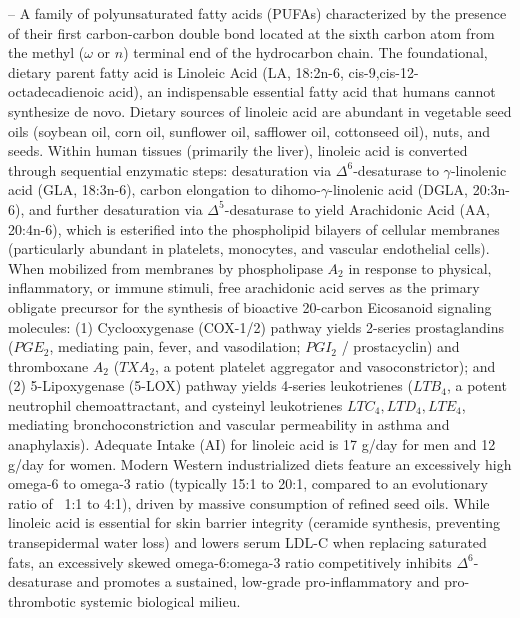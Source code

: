 -- A family of polyunsaturated fatty acids (PUFAs) characterized by the presence of their first carbon-carbon double bond located at the sixth carbon atom from the methyl ($\omega$ or $n$) terminal end of the hydrocarbon chain. The foundational, dietary parent fatty acid is Linoleic Acid (LA, 18:2n-6, cis-9,cis-12-octadecadienoic acid), an indispensable essential fatty acid that humans cannot synthesize de novo. Dietary sources of linoleic acid are abundant in vegetable seed oils (soybean oil, corn oil, sunflower oil, safflower oil, cottonseed oil), nuts, and seeds. Within human tissues (primarily the liver), linoleic acid is converted through sequential enzymatic steps: desaturation via $\Delta^6$-desaturase to $\gamma$-linolenic acid (GLA, 18:3n-6), carbon elongation to dihomo-$\gamma$-linolenic acid (DGLA, 20:3n-6), and further desaturation via $\Delta^5$-desaturase to yield Arachidonic Acid (AA, 20:4n-6), which is esterified into the phospholipid bilayers of cellular membranes (particularly abundant in platelets, monocytes, and vascular endothelial cells). When mobilized from membranes by phospholipase $A_2$ in response to physical, inflammatory, or immune stimuli, free arachidonic acid serves as the primary obligate precursor for the synthesis of bioactive 20-carbon Eicosanoid signaling molecules: (1) Cyclooxygenase (COX-1/2) pathway yields 2-series prostaglandins ($PGE_2$, mediating pain, fever, and vasodilation; $PGI_2$ / prostacyclin) and thromboxane $A_2$ ($TXA_2$, a potent platelet aggregator and vasoconstrictor); and (2) 5-Lipoxygenase (5-LOX) pathway yields 4-series leukotrienes ($LTB_4$, a potent neutrophil chemoattractant, and cysteinyl leukotrienes $LTC_4, LTD_4, LTE_4$, mediating bronchoconstriction and vascular permeability in asthma and anaphylaxis). Adequate Intake (AI) for linoleic acid is 17 g/day for men and 12 g/day for women. Modern Western industrialized diets feature an excessively high omega-6 to omega-3 ratio (typically 15:1 to 20:1, compared to an evolutionary ratio of ~1:1 to 4:1), driven by massive consumption of refined seed oils. While linoleic acid is essential for skin barrier integrity (ceramide synthesis, preventing transepidermal water loss) and lowers serum LDL-C when replacing saturated fats, an excessively skewed omega-6:omega-3 ratio competitively inhibits $\Delta^6$-desaturase and promotes a sustained, low-grade pro-inflammatory and pro-thrombotic systemic biological milieu.

